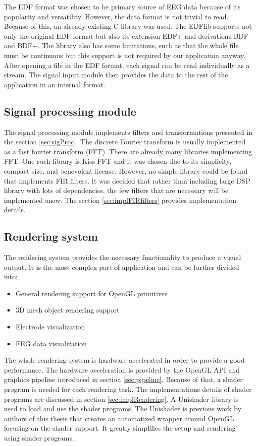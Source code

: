 The EDF format was chosen to be primary source of EEG data because of its popularity and versatility. However, the data format is not trivial to read. Because of this, an already existing C library was used. The EDFlib supports not only the original EDF format but also its extension EDF+ and derivations BDF and BDF+. The library also has some limitations, such as that the whole file must be continuous but this support is not required by our application anyway. After opening a file in the EDF format, each signal can be read individually as a stream. The signal input module then provides the data to the rest of the application in an internal format.

\subsection{Signal processing module}
The signal processing module implements filters and transformations presented in the section \ref{sec:sigProc}. The discrete Fourier transform is usually implemented as a fast fourier transform (FFT). There are already many libraries implementing FFT. One such library is Kiss FFT and it was chosen due to its simplicity, compact size, and benevolent license. However, no simple library could be found that implements FIR filters. It was decided that rather than including large DSP library with lots of dependencies, the few filters that are necessary will be implemented anew. The section \ref{sec:implFIRfilters} provides implementation details.

\subsection{Rendering system}
The rendering system provides the necessary functionality to produce a visual output. It is the most complex part of application and can be further divided into:
\begin{itemize}
	\item General rendering support for OpenGL primitives
	\item 3D mesh object rendering support
	\item Electrode visualization
	\item EEG data visualization
\end{itemize}

The whole rendering system is hardware accelerated in order to provide a good performance. The hardware acceleration is provided by the OpenGL API and graphics pipeline introduced in section \ref{sec:pipeline}. Because of that, a shader program is needed for each rendering task. The implementations details of shader programs are discussed in section \ref{sec:implRendering}. A Unishader library is used to load and use the shader programs. The Unishader is previous work by authors of this thesis that creates an automatized wrapper around OpenGL focusing on the shader support. It greatly simplifies the setup and rendering using shader programs.

